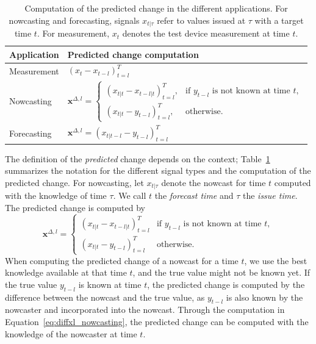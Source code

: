 \documentclass[pdflatex]{sn-jnl}
\theoremstyle{plain}%
\theoremstyle{definition}
\newcommand{\diffxl}{\mathbf{x}^{\Delta,l}}
\begin{document}
\begin{table}
    \centering
    \scriptsize
    \begin{tabular}{l l}
        \toprule
        Application & Predicted change computation \\
        \midrule
        Measurement & $(x_{t} - x_{t-l})_{t=l}^T $\\
        Nowcasting & $
\diffxl =
\begin{cases}
(x_{t|t} - x_{t-l|t})^T_{t=l}, & \text{if } y_{t-l} \text{ is not known at time } t, \\
(x_{t|t} - y_{t-l})^T_{t=l}, & \text{otherwise}.
\end{cases}
$ \\
        Forecasting & $ \diffxl = (x_{t|t-l} - y_{t-l})^T_{t=l}$\\
        \bottomrule
    \end{tabular}
    \caption[Computation of the predicted change in the different applications.]{Computation of the predicted change in the different applications. For nowcasting and forecasting, signals $x_{t | \tau}$ refer to values issued at $\tau$ with a target time $t$. For measurement, $x_t$ denotes the test device measurement at time $t$.}
    \label{tab:notation}
\end{table}

The definition of the \textit{predicted} change depends on the context;
Table~\ref{tab:notation} summarizes the notation for the different signal types and the computation of the predicted change.
For nowcasting, let $x_{t | \tau}$ denote the nowcast for time $t$ computed with the knowledge of time $\tau$.
We call $t$ the \textit{forecast time} and $\tau$ the \textit{issue time}.
The predicted change is computed by
\begin{equation}
  \diffxl =
\begin{cases}
(x_{t|t} - x_{t-l|t})^T_{t=l} & \text{if } y_{t-l} \text{ is not known at time } t, \\
(x_{t|t} - y_{t-l})^T_{t=l} & \text{otherwise}.
\end{cases} \label{eq:diffxl_nowcasting}
\end{equation}
When computing the predicted change of a nowcast for a time $t$, we use the best knowledge available at that time $t$, and the true value might not be known yet.
If the true value $y_{t-l}$ is known at time $t$, the predicted change is computed by the difference between the nowcast and the true value, as $y_{t-l}$ is also known by the nowcaster and incorporated into the nowcast.
Through the computation in Equation~\eqref{eq:diffxl_nowcasting}, the predicted change can be computed with the knowledge of the nowcaster at time $t$.
\end{document}
